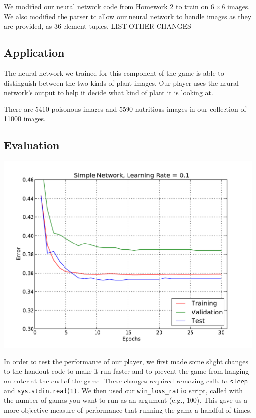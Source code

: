 \documentclass[solution, letterpaper]{cs121}
\begin{document}
We modified our neural network code from Homework 2 to train on $6 \times 6$ images. We also modified the parser to allow our neural network to handle images as they are provided, as 36 element tuples. LIST OTHER CHANGES

\subsection{Application}
\hspace{4mm} The neural network we trained for this component of the game is able to distinguish between the two kinds of plant images. Our player uses the neural network's output to help it decide what kind of plant it is looking at.

There are 5410 poisonous images and 5590 nutritious images in our collection of 11000 images.

\subsection{Evaluation}
\begin{center}
\includegraphics[scale=0.8]{source/simple-network-alpha-0_1.pdf}
\end{center}

In order to test the performance of our player, we first made some slight changes to the handout code to make it run faster and to prevent the game from hanging on enter at the end of the game. These changes required removing calls to {\tt sleep} and {\tt sys.stdin.read(1)}. We then used our {\tt win\_loss\_ratio} script, called with the number of games you want to run as an argument (e.g., 100). This gave us a more objective measure of performance that running the game a handful of times.
\end{document}
